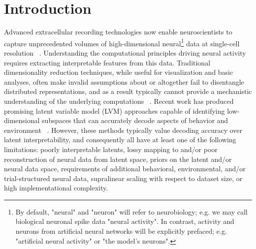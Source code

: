 \section{Introduction}

Advanced extracellular recording technologies now enable neuroscientists to capture unprecedented volumes of high-dimensional neural\footnote{By default, "neural" and "neuron" will refer to neurobiology; e.g. we may call biological neuronal spike data "neural activity". In contrast, activity and neurons from artificial neural networks will be explicitly prefaced; e.g. "artificial neural activity" or "the model's neurons".} data at single-cell resolution ~\cite{steinmetz_2021_neuropixels2, raducanu_2017_neuroseeker, cai_2016_miniscope, villette_2019_voltage_2p, ouzounov_2017_three_photon, ahrens_2013_lightsheet}. Understanding the computational principles driving neural activity requires extracting interpretable features from this data. Traditional dimensionality reduction techniques, while useful for visualization and basic analyses, often make invalid assumptions about or altogether fail to disentangle distributed representations, and as a result typically cannot provide a mechanistic understanding of the underlying computations ~\cite{cunningham_2014_neural_dr, humphries_2021_dr_principles}. Recent work has produced promising latent variable model (LVM) approaches capable of identifying low-dimensional subspaces that can accurately decode aspects of behavior and environment ~\cite{song_2025_langevinflow, schneider_2023_cebra, le_2022_stndt, keshtkaran_2022_autolfads, yu_2009_gpfa, macke_2011_plds, gao_2016_pflds, low_2018_mind, jensen_2020_mgplvm, hernandez_2020_vind, kim_2021_plnde, hurwitz_2021_tndm, schimel_2022_ilqrvae, kudryashova_2023_ctrltndm, ye_2023_ndt2, gondur_2024_mmgpvae, pellegrino_2024_slicetca, sani_2024_dpad, pals_2024_smclr_rnn, zhang_2024_mtm, george_2025_simpl, perkins_2025_mint, schmutz_2025_nce}. However, these methods typically value decoding accuracy over latent interpretability, and consequently all have at least one of the following limitations: poorly interpretable latents, lossy mapping to and/or poor reconstruction of neural data from latent space, priors on the latent and/or neural data space, requirements of additional behavioral, environmental, and/or trial-structured neural data, supralinear scaling with respect to dataset size, or high implementational complexity.

